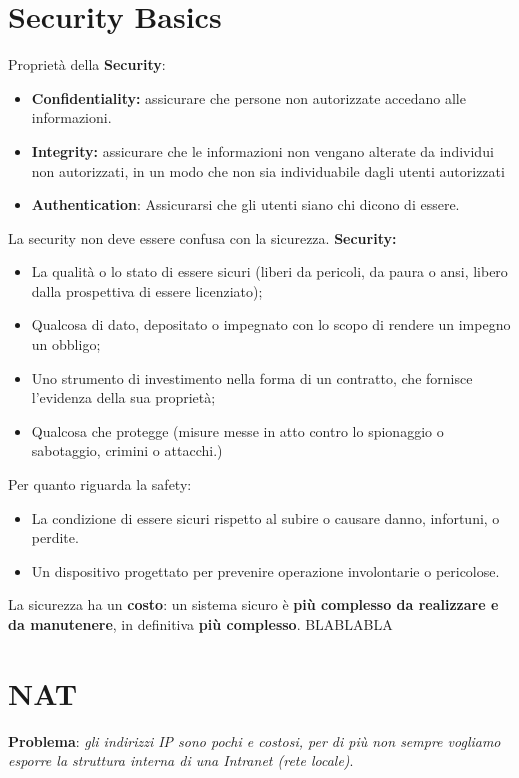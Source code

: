 \documentclass[12pt]{article}
\begin{document}
	
	\maketitle
	\tableofcontents
	\listoftables
	\listoffigures
	
	\section{Security Basics}
		Proprietà della \textbf{Security}:
		\begin{itemize}
			\item \textbf{Confidentiality:} assicurare che persone non autorizzate accedano alle informazioni.
			\item \textbf{Integrity:} assicurare che le informazioni non vengano alterate da individui non autorizzati, in un modo che non sia individuabile dagli utenti autorizzati
			\item \textbf{Authentication}: Assicurarsi che gli utenti siano chi  dicono di essere.
		\end{itemize}
		La security non deve essere confusa con la sicurezza. \textbf{Security:}
		\begin{itemize}
			\item La qualità o lo stato di essere sicuri (liberi da pericoli, da paura o ansi, libero dalla prospettiva di essere licenziato);
			\item Qualcosa di dato, depositato o impegnato con lo scopo di rendere un impegno un obbligo;
			\item Uno strumento di investimento nella forma di un contratto, che fornisce l'evidenza della sua proprietà;
			\item Qualcosa che protegge (misure messe in atto contro lo spionaggio o sabotaggio, crimini o attacchi.)
		\end{itemize}
		Per quanto riguarda la safety:
		\begin{itemize}
			\item La condizione di essere sicuri rispetto al subire o causare danno, infortuni, o perdite.
			\item Un dispositivo progettato per prevenire operazione involontarie o pericolose.	
		\end{itemize}
		La sicurezza ha un \textbf{costo}: un sistema sicuro è \textbf{più complesso da realizzare e da manutenere}, in definitiva \textbf{più complesso}. BLABLABLA
		
	\section{NAT}
		\textbf{Problema}: \textit{gli indirizzi IP sono pochi e costosi, per di più non sempre vogliamo esporre la struttura interna di una Intranet (rete locale)}.\\
		
\end{document}
